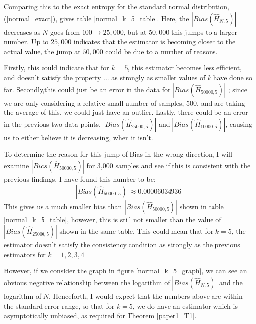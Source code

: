 \documentclass{report}
\begin{document}
Comparing this to the exact entropy for the standard normal distribution, (\ref{normal_exact}), gives table \ref{normal_k=5_table}. Here, the $|Bias(\hat{H}_{N, 5})|$ decreases as $N$ goes from $100 \to 25,000$, but at $50,000$ this jumps to a larger number. Up to $25,000$ indicates that the estimator is becoming closer to the actual value, the jump at $50,000$  could be due to a number of reasons. 

Firstly, this could indicate that for $k=5$, this estimator becomes less efficient, and doesn't satisfy the property ...  as strongly as smaller values of $k$ have done so far. Secondly,this could just be an error in the data for $|Bias(\hat{H}_{50000, 5})|$ ; since we are only considering a relative small number of samples, 500, and are taking the average of this, we could just have an outlier. Lastly, there could be an error in the previous two data points, $|Bias(\hat{H}_{25000, 5})|$ and $|Bias(\hat{H}_{10000, 5})|$, causing us to either believe it is decreasing, when it isn't.

To determine the reason for this jump of Bias in the wrong direction, I will examine $|Bias(\hat{H}_{50000, 5})|$ for 3,000 samples and see if this is consistent with the previous findings. I have found this number to be; 
\begin{equation} 
|Bias(\hat{H}_{50000, 5})|  \approx 0.00006034936 \nonumber
\end{equation}
This gives us a much smaller bias than $|Bias(\hat{H}_{50000, 5})|$ shown in table \ref{normal_k=5_table}, however, this is still not smaller than the value of $|Bias(\hat{H}_{25000, 5})|$ shown in the same table. This could mean that for $k=5$, the estimator doesn't satisfy the consistency condition as strongly as the previous estimators for $k=1, 2, 3, 4$.

However, if we consider the graph in figure \ref{normal_k=5_graph}, we can see an obvious negative relationship between the logarithm of $|Bias(\hat{H}_{N, 5})|$ and the logarithm of $N$. Henceforth, I would expect that the numbers above are within the standard error range, so that for $k=5$, we do have an estimator which is asymptotically unbiased, as required for Theorem \ref{paper1_T1}.
\end{document}
